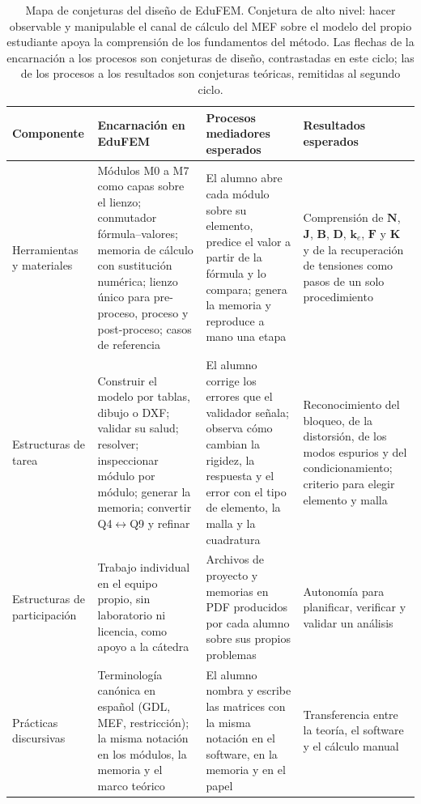 \begin{table}[htbp]
\centering
\caption[Mapa de conjeturas del diseño de EduFEM.]{Mapa de conjeturas del diseño de EduFEM. Conjetura de alto nivel: hacer observable y manipulable el canal de cálculo del MEF sobre el modelo del propio estudiante apoya la comprensión de los fundamentos del método. Las flechas de la encarnación a los procesos son conjeturas de diseño, contrastadas en este ciclo; las de los procesos a los resultados son conjeturas teóricas, remitidas al segundo ciclo.}
\label{tab:conjeturas}
{\footnotesize
\setlength{\tabcolsep}{3pt}
\renewcommand{\arraystretch}{1.15}
\begin{tabular}{@{}>{\raggedright\arraybackslash}p{2.4cm}>{\raggedright\arraybackslash}p{4.6cm}>{\raggedright\arraybackslash}p{4.2cm}>{\raggedright\arraybackslash}p{3.6cm}@{}}
\toprule
\textbf{Componente} & \textbf{Encarnación en EduFEM} & \textbf{Procesos mediadores esperados} & \textbf{Resultados esperados} \\
\midrule
Herramientas y materiales & Módulos M0 a M7 como capas sobre el lienzo; conmutador fórmula--valores; memoria de cálculo con sustitución numérica; lienzo único para pre-proceso, proceso y post-proceso; casos de referencia & El alumno abre cada módulo sobre su elemento, predice el valor a partir de la fórmula y lo compara; genera la memoria y reproduce a mano una etapa & Comprensión de $\bm{N}$, $\bm{J}$, $\bm{B}$, $\bm{D}$, $\bm{k}_e$, $\bm{F}$ y $\bm{K}$ y de la recuperación de tensiones como pasos de un solo procedimiento \\
Estructuras de tarea & Construir el modelo por tablas, dibujo o DXF; validar su salud; resolver; inspeccionar módulo por módulo; generar la memoria; convertir Q4$\leftrightarrow$Q9 y refinar & El alumno corrige los errores que el validador señala; observa cómo cambian la rigidez, la respuesta y el error con el tipo de elemento, la malla y la cuadratura & Reconocimiento del bloqueo, de la distorsión, de los modos espurios y del condicionamiento; criterio para elegir elemento y malla \\
Estructuras de participación & Trabajo individual en el equipo propio, sin laboratorio ni licencia, como apoyo a la cátedra & Archivos de proyecto y memorias en PDF producidos por cada alumno sobre sus propios problemas & Autonomía para planificar, verificar y validar un análisis \\
Prácticas discursivas & Terminología canónica en español (GDL, MEF, restricción); la misma notación en los módulos, la memoria y el marco teórico & El alumno nombra y escribe las matrices con la misma notación en el software, en la memoria y en el papel & Transferencia entre la teoría, el software y el cálculo manual \\
\bottomrule
\end{tabular}}
\end{table}


